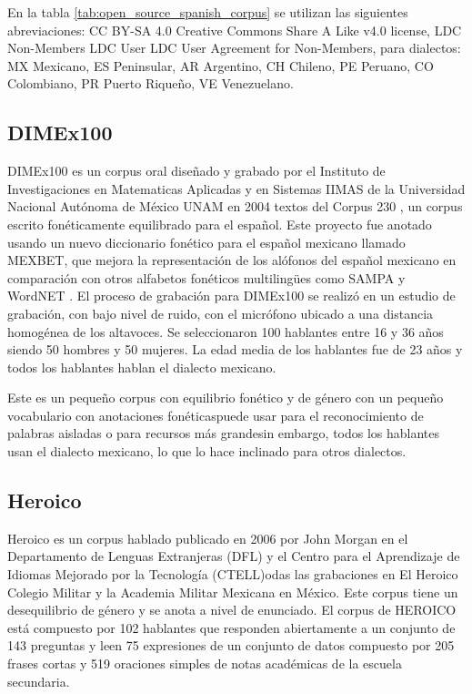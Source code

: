 En la tabla \ref{tab:open_source_spanish_corpus} se utilizan las siguientes abreviaciones:  CC BY-SA 4.0 Creative Commons Share A Like v4.0 license, LDC Non-Members LDC User LDC User Agreement for Non-Members, para dialectos: MX Mexicano, ES Peninsular, AR Argentino, CH Chileno, PE Peruano, CO Colombiano, PR Puerto Riqueño, VE Venezuelano. 



\subsection{DIMEx100}

DIMEx100 es un corpus oral diseñado y grabado por el Instituto de Investigaciones en Matematicas Aplicadas y en Sistemas IIMAS de la Universidad Nacional Autónoma de México UNAM en 2004 textos del Corpus 230 \cite{Corpus230}, un corpus escrito fonéticamente equilibrado para el español.  Este proyecto fue anotado usando un nuevo diccionario fonético para el español mexicano llamado MEXBET, que mejora la representación de los alófonos del español mexicano en comparación con otros alfabetos fonéticos multilingües como SAMPA y WordNET \cite{mexbet}. El proceso de grabación para DIMEx100 se realizó en un estudio de grabación, con bajo nivel de ruido, con el micrófono ubicado a una distancia homogénea de los altavoces. Se seleccionaron 100 hablantes entre 16 y 36 años siendo 50 hombres y 50 mujeres. La edad media de los hablantes fue de 23 años y todos los hablantes hablan el dialecto mexicano.

Este es un pequeño corpus  con equilibrio fonético y de género con un pequeño vocabulario  con anotaciones fonéticaspuede usar para el reconocimiento de palabras aisladas o  para recursos más grandesin embargo, todos los hablantes usan el dialecto mexicano, lo que lo hace inclinado para otros dialectos.

\subsection{Heroico}

Heroico es un corpus hablado publicado en 2006 por John Morgan en el Departamento de Lenguas Extranjeras (DFL) y el Centro para el Aprendizaje de Idiomas Mejorado por la Tecnología (CTELL)odas las grabaciones  en El Heroico Colegio Militar y la Academia Militar Mexicana en México. Este corpus tiene un desequilibrio de género y se anota a nivel de enunciado. El corpus de HEROICO está compuesto por 102 hablantes que responden abiertamente a un conjunto de 143 preguntas y leen 75 expresiones de un conjunto de datos compuesto por 205 frases cortas y 519 oraciones simples de notas académicas de la escuela secundaria.

